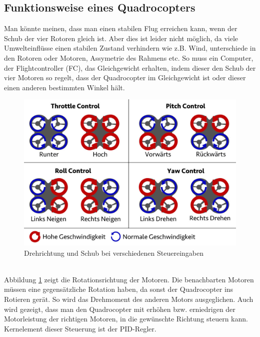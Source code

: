 \documentclass[12pt,a4paper, ngerman]{article}
\begin{document}
\subsection{Funktionsweise eines Quadrocopters}
Man könnte meinen, dass man einen stabilen Flug erreichen kann, wenn der Schub der vier Rotoren gleich ist. Aber dies ist leider nicht möglich, da viele Umwelteinflüsse einen stabilen Zustand verhindern wie z.B. Wind, unterschiede in den Rotoren oder Motoren, Assymetrie des Rahmens etc. So muss ein Computer, der Flightcontroller (FC), das Gleichgewicht erhalten, indem dieser den Schub der vier Motoren so regelt, dass der Quadrocopter im Gleichgewicht ist oder dieser einen anderen bestimmten Winkel hält.\\
\begin{figure}[h]
\centering
\includegraphics[width=\textwidth]{MotionDE.jpg}
\caption[\url{http://fpvracing.ch/img/cms/MotionDE.jpg}]{Drehrichtung und Schub bei verschiedenen Steuereingaben } \label{dreh}
\end{figure}\\
Abbildung \ref{dreh} zeigt die Rotationsrichtung der Motoren. Die benachbarten Motoren müssen eine gegensätzliche Rotation haben, da sonst der Quadrocopter ins Rotieren gerät. So wird das Drehmoment des anderen Motors ausgeglichen. Auch wird gezeigt, dass man den Quadrocopter mit erhöhen bzw. erniedrigen der Motorleistung der richtigen Motoren, in die gewünschte Richtung steuern kann. Kernelement dieser Steuerung ist der PID-Regler.
\newpage
\end{document}
